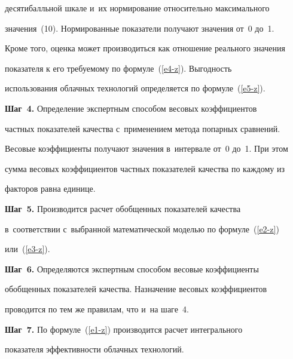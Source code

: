 десятибалльной шкале и~их нормирование относительно максимального 

значения~(10). Нормированные показатели получают значения от~0 до~1. 

Кроме того, оценка может производиться как отношение реального значения 

показателя к его требуемому по формуле~(\ref{e4-z}). Выгодность 

использования облачных технологий определяется по формуле~(\ref{e5-z}). 



\vspace*{2pt}

  

  \textbf{Шаг~4.} Определение экспертным способом весовых коэффициентов 

частных показателей качества с~применением метода попарных сравнений. 

Весовые коэффициенты получают значения в~интервале от~0 до~1. При этом 

сумма весовых коэффициентов частных показателей качества по каждому из 

факторов равна единице. 

  

  \vspace*{2pt}

  

  \textbf{Шаг~5.} Производится расчет обобщенных показателей качества 

в~соответствии с~выбранной математической моделью по формуле~(\ref{e2-z}) 

или~(\ref{e3-z}). 



\vspace*{2pt}

  

  \textbf{Шаг~6.} Определяются экспертным способом весовые коэффициенты 

обобщенных показателей качества. Назначение весовых коэффициентов 

проводится по тем же правилам, что и~на шаге~4.



\vspace*{2pt}

  

  \textbf{Шаг~7.} По формуле~(\ref{e1-z}) производится расчет интегрального 

показателя эффективности облачных технологий.



